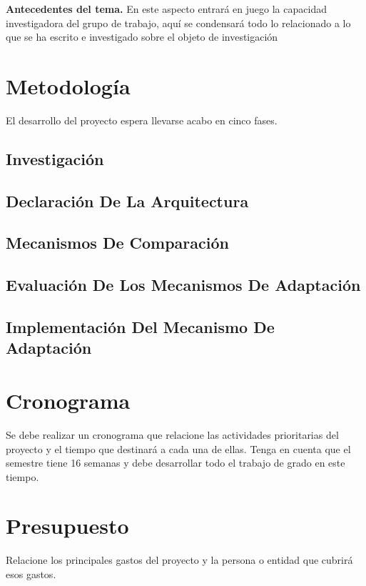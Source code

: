 \documentclass[12pt]{article}
\begin{document}
    \textbf{Antecedentes del tema.}  En este aspecto entrará en juego la capacidad investigadora del grupo de trabajo, aquí se condensará todo lo relacionado a lo que se ha escrito e investigado sobre el objeto de investigación

    \section{Metodología}

    El desarrollo del proyecto espera llevarse acabo en cinco fases.

    \subsection{Investigación}


    \subsection{Declaración De La Arquitectura}
    

    \subsection{Mecanismos De Comparación}
    \subsection{Evaluación De Los Mecanismos De Adaptación}
    \subsection{Implementación Del Mecanismo De Adaptación}


    \section{Cronograma}

    Se debe realizar un cronograma que relacione las actividades prioritarias del proyecto y el tiempo que destinará a cada una de ellas.  Tenga en cuenta que el semestre tiene 16 semanas y debe desarrollar todo el trabajo de grado en este tiempo.

    \section{Presupuesto}

    Relacione los principales gastos del proyecto y la persona o entidad que cubrirá esos gastos.
\end{document}
